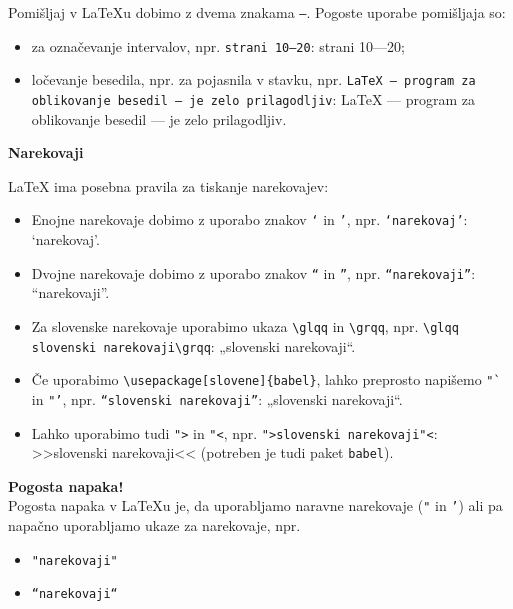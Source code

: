 Pomišljaj v LaTeXu dobimo z dvema znakama \texttt{--}.
Pogoste uporabe pomišljaja so:

\begin{itemize}
\item za označevanje intervalov, npr. \texttt{strani 10--20}: strani 10---20;
\item ločevanje besedila, npr. za pojasnila v stavku, npr. \texttt{LaTeX -- program za oblikovanje besedil -- je zelo prilagodljiv}: LaTeX --- program za oblikovanje besedil --- je zelo prilagodljiv.
\end{itemize}

\textbf{Narekovaji}

LaTeX ima posebna pravila za tiskanje narekovajev:

\begin{itemize}
\item Enojne narekovaje dobimo z uporabo znakov \texttt{`} in \texttt{'}, npr. \texttt{`narekovaj'}: `narekovaj'.
\item Dvojne narekovaje dobimo z uporabo znakov \texttt{``} in \texttt{''}, npr. \texttt{``narekovaji''}: ``narekovaji''.
\item Za slovenske narekovaje uporabimo ukaza \texttt{{\textbackslash}glqq} in \texttt{{\textbackslash}grqq}, npr. \texttt{{\textbackslash}glqq slovenski narekovaji{\textbackslash}grqq}: „slovenski narekovaji``.
\item Če uporabimo \texttt{{\textbackslash}usepackage[slovene]\{babel\}}, lahko preprosto napišemo \texttt{"`} in \texttt{"'}, npr. \texttt{"`slovenski narekovaji"'}: „slovenski narekovaji``.
\item Lahko uporabimo tudi \texttt{"\textgreater } in  \texttt{"\textless }, npr. \texttt{"\textgreater slovenski narekovaji"\textless }: >>slovenski narekovaji<< (potreben je tudi paket \texttt{babel}).
\end{itemize}

\begin{framed}
\textbf{Pogosta napaka!}\\
Pogosta napaka v LaTeXu je, da uporabljamo naravne narekovaje (\texttt{"} in \texttt{'}) ali pa napačno uporabljamo ukaze za narekovaje, npr.

\begin{itemize}
\item \texttt{"narekovaji"}
\item \texttt{``narekovaji``}
\end{itemize}
\end{framed}

